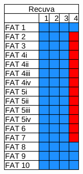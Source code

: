 \begin{figure}
\begin{subfigure}{0.16\linewidth}
    \end{subfigure}    
    \begin{subfigure}{0.16\linewidth}
        \includegraphics[width=\linewidth]{fig/recuva_results_fat.png}

\end{subfigure}
\end{figure}
